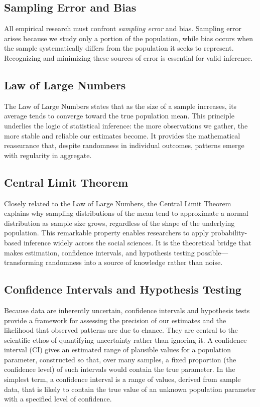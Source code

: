 \documentclass[
  letterpaper,
  DIV=11,
  numbers=noendperiod]{scrreprt}
\begin{document}
\subsection{Sampling Error and Bias}\label{sampling-error-and-bias}

All empirical research must confront \emph{sampling error} and bias.
Sampling error arises because we study only a portion of the population,
while bias occurs when the sample systematically differs from the
population it seeks to represent. Recognizing and minimizing these
sources of error is essential for valid inference.

\subsection{Law of Large Numbers}\label{law-of-large-numbers}

The Law of Large Numbers states that as the size of a sample increases,
its average tends to converge toward the true population mean. This
principle underlies the logic of statistical inference: the more
observations we gather, the more stable and reliable our estimates
become. It provides the mathematical reassurance that, despite
randomness in individual outcomes, patterns emerge with regularity in
aggregate.

\subsection{Central Limit Theorem}\label{central-limit-theorem}

Closely related to the Law of Large Numbers, the Central Limit Theorem
explains why sampling distributions of the mean tend to approximate a
normal distribution as sample size grows, regardless of the shape of the
underlying population. This remarkable property enables researchers to
apply probability-based inference widely across the social sciences. It
is the theoretical bridge that makes estimation, confidence intervals,
and hypothesis testing possible---transforming randomness into a source
of knowledge rather than noise.

\subsection{Confidence Intervals and Hypothesis
Testing}\label{confidence-intervals-and-hypothesis-testing}

Because data are inherently uncertain, confidence intervals and
hypothesis tests provide a framework for assessing the precision of our
estimates and the likelihood that observed patterns are due to chance.
They are central to the scientific ethos of quantifying uncertainty
rather than ignoring it. A confidence interval (CI) gives an estimated
range of plausible values for a population parameter, constructed so
that, over many samples, a fixed proportion (the confidence level) of
such intervals would contain the true parameter. In the simplest term, a
confidence interval is a range of values, derived from sample data, that
is likely to contain the true value of an unknown population parameter
with a specified level of confidence.
\end{document}
